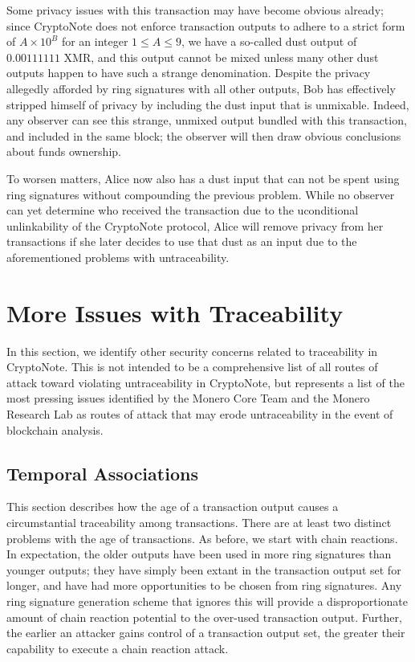\documentclass[12pt,english]{mrl}
\theoremstyle{definition}
\renewcommand{\leq}{\leqslant}
\numberwithin{equation}{section}
\numberwithin{figure}{section}
\numberwithin{equation}{section}
\numberwithin{equation}{section}
\numberwithin{figure}{section}
\begin{document}
Some privacy issues with this transaction may have become obvious already; since CryptoNote does not enforce transaction outputs to adhere to a strict form of $A \times 10^{B}$ for an integer $1 \leq A \leq 9$, we have a so-called dust output of $0.00111111$ XMR, and this output cannot be mixed unless many other dust outputs happen to have such a strange denomination. Despite the privacy allegedly afforded by ring signatures with all other outputs, Bob has effectively stripped himself of privacy by including the dust input that is unmixable. Indeed, any observer can see this strange, unmixed output bundled with this transaction, and included in the same block; the observer will then draw obvious conclusions about funds ownership.

To worsen matters, Alice now also has a dust input that can not be spent using ring signatures without compounding the previous problem. While no observer can yet determine who received the transaction due to the uconditional unlinkability of the CryptoNote protocol, Alice will remove privacy from her transactions if she later decides to use that dust as an input due to the aforementioned problems with untraceability.

\section{More Issues with Traceability}\label{moreIssues}
In this section, we identify other security concerns related to traceability in CryptoNote. This is not intended to be a comprehensive list of all routes of attack toward violating untraceability in CryptoNote, but represents a list of the most pressing issues identified by the Monero Core Team and the Monero Research Lab as routes of attack that may erode untraceability in the event of blockchain analysis.

\subsection{Temporal Associations}\label{temporalAssociations}

This section describes how the age of a transaction output causes a circumstantial traceability among transactions. There are at least two distinct problems with the age of transactions. As before, we start with chain reactions. In expectation, the older outputs have been used in more ring signatures than younger outputs; they have simply been extant in the transaction output set for longer, and have had more opportunities to be chosen from ring signatures. Any ring signature generation scheme that ignores this will provide a disproportionate amount of chain reaction potential to the over-used transaction output. Further, the earlier an attacker gains control of a transaction output set, the greater their capability to execute a chain reaction attack.
\end{document}
